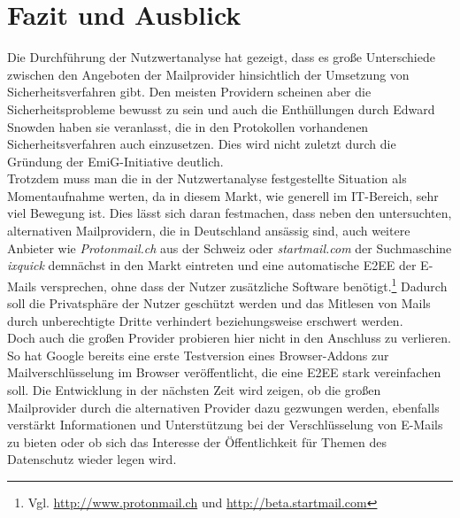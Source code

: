 \documentclass  [paper=a4,
				fontsize=12pt,
				listof=totoc,
				bibliography=totoc
				]{scrreprt}
\begin{document}
{			
	\chapter{Fazit und Ausblick}
		\color{black}
		Die Durchführung der Nutzwertanalyse hat gezeigt, dass es große Unterschiede zwischen den Angeboten der Mailprovider hinsichtlich der Umsetzung von Sicherheitsverfahren gibt.
		Den meisten Providern scheinen aber die Sicherheitsprobleme bewusst zu sein und auch die Enthüllungen durch Edward Snowden haben sie veranlasst, die in den Protokollen vorhandenen Sicherheitsverfahren auch einzusetzen.
		Dies wird nicht zuletzt durch die Gründung der \ac{EmiG}-Initiative deutlich.\medskip\\
		
		Trotzdem muss man die in der Nutzwertanalyse festgestellte Situation als Momentaufnahme werten, da in diesem Markt, wie generell im IT-Bereich, sehr viel Bewegung ist.
		Dies lässt sich daran festmachen, dass neben den untersuchten, alternativen Mailprovidern, die in Deutschland ansässig sind, auch weitere Anbieter wie \textit{Protonmail.ch} aus der Schweiz oder \textit{startmail.com} der Suchmaschine \textit{ixquick} demnächst in den Markt eintreten und eine automatische \ac{E2EE} der E-Mails versprechen, ohne dass der Nutzer zusätzliche Software benötigt.\footnote{Vgl. \url{http://www.protonmail.ch} und \url{http://beta.startmail.com}}
		Dadurch soll die Privatsphäre der Nutzer geschützt werden und das Mitlesen von Mails durch unberechtigte Dritte verhindert beziehungsweise erschwert werden.\medskip\\
		
		Doch auch die großen Provider probieren hier nicht in den Anschluss zu verlieren.
		So hat Google bereits eine erste Testversion eines Browser-Addons zur Mailverschlüsselung im Browser veröffentlicht, die eine \ac{E2EE} stark vereinfachen soll.		
		Die Entwicklung in der nächsten Zeit wird zeigen, ob die großen Mailprovider durch die alternativen Provider dazu gezwungen werden, ebenfalls verstärkt Informationen und Unterstützung bei der Verschlüsselung von E-Mails zu bieten oder ob sich das Interesse der Öffentlichkeit für Themen des Datenschutz wieder legen wird.\medskip\\
		
}
\end{document}
